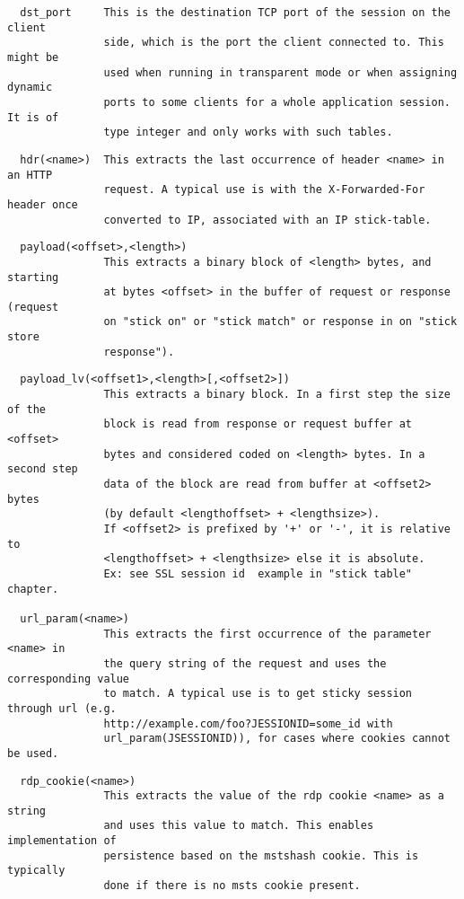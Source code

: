 \begin{verbatim}
  dst_port     This is the destination TCP port of the session on the client
               side, which is the port the client connected to. This might be
               used when running in transparent mode or when assigning dynamic
               ports to some clients for a whole application session. It is of
               type integer and only works with such tables.
\end{verbatim}

\begin{verbatim}
  hdr(<name>)  This extracts the last occurrence of header <name> in an HTTP
               request. A typical use is with the X-Forwarded-For header once
               converted to IP, associated with an IP stick-table.
\end{verbatim}

\begin{verbatim}
  payload(<offset>,<length>)
               This extracts a binary block of <length> bytes, and starting
               at bytes <offset> in the buffer of request or response (request
               on "stick on" or "stick match" or response in on "stick store
               response").
\end{verbatim}

\begin{verbatim}
  payload_lv(<offset1>,<length>[,<offset2>])
               This extracts a binary block. In a first step the size of the
               block is read from response or request buffer at <offset>
               bytes and considered coded on <length> bytes. In a second step
               data of the block are read from buffer at <offset2> bytes
               (by default <lengthoffset> + <lengthsize>).
               If <offset2> is prefixed by '+' or '-', it is relative to
               <lengthoffset> + <lengthsize> else it is absolute.
               Ex: see SSL session id  example in "stick table" chapter.
                
  url_param(<name>)
               This extracts the first occurrence of the parameter <name> in
               the query string of the request and uses the corresponding value
               to match. A typical use is to get sticky session through url (e.g.
               http://example.com/foo?JESSIONID=some_id with
               url_param(JSESSIONID)), for cases where cookies cannot be used.
\end{verbatim}

\begin{verbatim}
  rdp_cookie(<name>)
               This extracts the value of the rdp cookie <name> as a string
               and uses this value to match. This enables implementation of
               persistence based on the mstshash cookie. This is typically
               done if there is no msts cookie present.
\end{verbatim}

